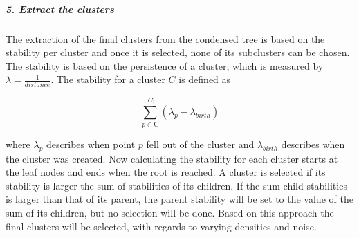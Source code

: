 \subparagraph{5. Extract the clusters}

The extraction of the final clusters from the condensed tree is based on the stability per cluster and once it is selected, none of its subclusters can be chosen. The stability is based on the persistence of a cluster, which is measured by $\lambda = \frac{1}{distance}$. The stability for a cluster $C$ is defined as

\begin{equation}
\sum_{p \in \text{C}}^{|C|} ({\lambda}_{p} - {\lambda}_{birth})
\end{equation}

 where ${\lambda}_{p}$ describes when point $p$ fell out of the cluster and $ {\lambda}_{birth}$ describes when the cluster was created. Now calculating the stability for each cluster starts at the leaf nodes and ends when the root is reached. A cluster is selected if its stability is larger the sum of stabilities of its children. If the sum child stabilities is larger than that of its parent, the parent stability will be set to the value of the sum of its children, but no selection will be done. Based on this approach the final clusters will be selected, with regards to varying densities and noise.